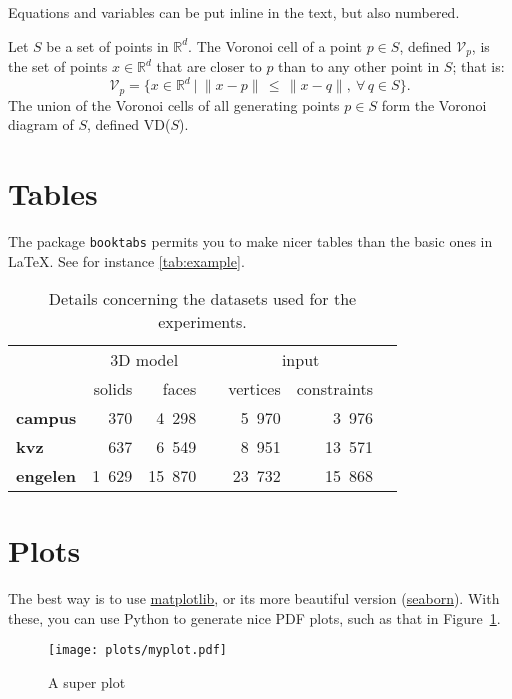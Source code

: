 Equations and variables can be put inline in the text, but also numbered.

Let $S$ be a set of points in $\mathbb{R}^d$. 
The Voronoi cell of a point $p \in S$, defined $\mathcal{V}_{p}$, is the set of points $x \in \mathbb{R}^d$ that are closer to $p$ than to any other point in $S$; that is:
\begin{equation}
\mathcal{V}_p = \{x \in \mathbb{R}^{d} \ | \ \|x-p\| \, \leq \, \|x-q\|, \ \forall \, q \in S \}. 
\end{equation}
The union of the Voronoi cells of all generating points $p \in S$ form the Voronoi diagram of $S$, defined VD($S$).



%
\section{Tables}

The package \texttt{booktabs} permits you to make nicer tables than the basic ones in \LaTeX.
See for instance \autoref{tab:example}.
\begin{table}
  \centering
  \begin{tabular}{@{}lrrcrrc@{}} \toprule
    & \multicolumn{2}{c}{3D model} && \multicolumn{2}{c}{input} \\
    \cmidrule{2-3}  \cmidrule{5-6} 
    & solids & faces && vertices & constraints  \\ 
    \toprule
    \textbf{campus}  & 370   & 4~298  && 5~970  & 3~976   \\
    \textbf{kvz}     & 637   & 6~549  && 8~951  & 13~571  \\
    \textbf{engelen} & 1~629 & 15~870 && 23~732 & 15~868 \\ 
    \bottomrule
   \end{tabular}
  \caption{Details concerning the datasets used for the experiments.}%
\label{tab:example}
\end{table}


%
\section{Plots}

The best way is to use \href{http://matplotlib.org}{matplotlib}, or its more beautiful version (\href{http://stanford.edu/~mwaskom/software/seaborn/index.html}{seaborn}).
With these, you can use Python to generate nice PDF plots, such as that in Figure~\ref{fig:myplot}.
\begin{figure}
  \centering
  \texttt{[image: plots/myplot.pdf]}
  \caption{A super plot}%
\label{fig:myplot}
\end{figure}

